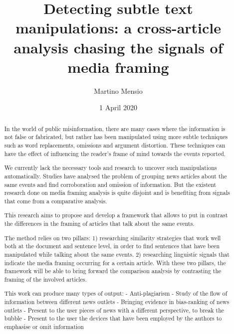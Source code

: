 \documentclass[12pt]{scrartcl}
\title{Detecting subtle text manipulations: a cross-article analysis chasing the signals of media framing}
\author{Martino Mensio}
\date{1 April 2020}
\begin{document}
\maketitle

\begin{abstract}
In the world of public misinformation, there are many cases where the information is not false or fabricated, but rather has been manipulated using more subtle techniques such as word replacements, omissions and argument distortion.
These techniques can have the effect of influencing the reader’s frame of mind towards the events reported.
	
We currently lack the necessary tools and research to uncover such manipulations automatically.
Studies have analysed the problem of grouping news articles about the same events and find corroboration and omission of information.
But the existent research done on media framing analysis is quite disjoint and is benefiting from signals that come from a comparative analysis.
	
This research aims to propose and develop a framework that allows to put in contrast the differences in the framing of articles that talk about the same events.
	
The method relies on two pillars: 1) researching similarity strategies that work well both at the document and sentence level, in order to find sentences that have been manipulated while talking about the same events. 2) researching linguistic signals that indicate the media framing occurring for a certain article. With these two pillars, the framework will be able to bring forward the comparison analysis by contrasting the framing of the involved articles.
	
This work can produce many types of output:
- Anti-plagiarism
- Study of the flow of information between different news outlets
- Bringing evidence in bias-ranking of news outlets
- Present to the user pieces of news with a different perspective, to break the bubble
- Present to the user the devices that have been employed by the authors to emphasise or omit information

	


\end{abstract}
\end{document}
